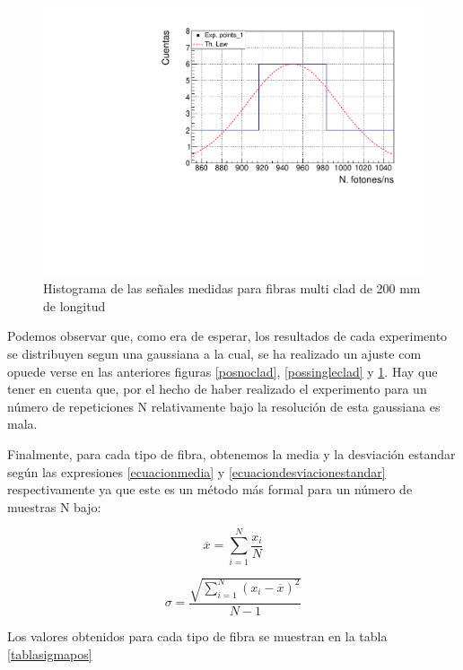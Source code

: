 \begin{figure}[hbtp]
\centering
\includegraphics[scale=0.7]{Figuras/multicladgauspos.pdf}
\caption{Histograma de las señales medidas para fibras multi clad de 200 mm de longitud\label{posmulticlad}}
\end{figure}

Podemos observar que, como era de esperar, los resultados de cada experimento se distribuyen segun una gaussiana a la cual, se ha realizado un ajuste com opuede verse en las anteriores figuras \ref{posnoclad}, \ref{possingleclad} y \ref{posmulticlad}. Hay que tener en cuenta que, por el hecho de haber realizado el experimento para un número de repeticiones N relativamente bajo la resolución de esta gaussiana es mala.

Finalmente, para cada tipo de fibra, obtenemos la media y la desviación estandar según las expresiones \ref{ecuacionmedia} y \ref{ecuaciondesviacionestandar} respectivamente ya que este es un método más formal para un número de muestras N bajo:

\begin{equation}
\overline{x}=\sum_{i=1}^N \dfrac{x_i}{N}
\label{ecuacionmedia}
\end{equation}

\begin{equation}
\sigma=\dfrac{\sqrt{\sum_{i=1}^N (x_i-\overline{x})^2}}{N-1}
\label{ecuaciondesviacionestandar}
\end{equation}

Los valores obtenidos para cada tipo de fibra se muestran en la tabla \ref{tablasigmapos}

